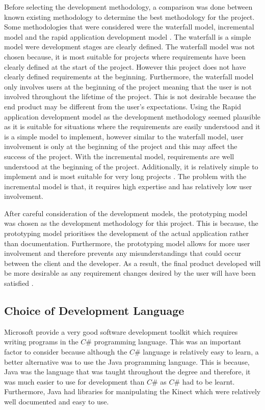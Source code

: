 \documentclass[a4paper, 12pt]{article}
\begin{document}
Before selecting the development methodology, a comparison was done between known existing methodology to determine the best methodology for the project. Some methodologies that were considered were the waterfall model, incremental model and the rapid application development model \citep{Sabale2012}. The waterfall is a simple model were development stages are clearly defined. The waterfall model was not chosen because, it is most suitable for projects where requirements have been clearly defined at the start of the project. However this project does not have clearly defined requirements at the beginning. Furthermore, the waterfall model only involves users at the beginning of the project meaning that the user is not involved throughout the lifetime of the project. This is not desirable because the end product may be different from the user's expectations.  Using the Rapid application development model as the development methodology seemed plausible as it is suitable for situations where the requirements are easily understood and it is a simple model to implement, however similar to the waterfall model, user involvement is only at the beginning of the project and this may affect the success of the project. With the incremental model, requirements are well understood at the beginning of the project. Additionally, it is relatively simple to implement and is most suitable for very long projects \citep{Sabale2012}. The problem with the incremental model is that, it requires high expertise and has relatively low user involvement.

\parskip 0.2in

After careful consideration of the development models, the prototyping model was chosen as the development methodology for this project. This is because, the prototyping model prioritises the development of the actual application rather than documentation. Furthermore, the prototyping model allows for more user involvement and therefore prevents any misunderstandings that could occur between the client and the developer. As a result, the final product developed will be more desirable as any requirement changes desired by the user will have been satisfied \citep{Sabale2012}.


\subsection{Choice of Development Language}
Microsoft provide a very good software development toolkit which requires writing programs in the $C\#$ programming language. This was an important factor to consider because although the $C\#$ language is relatively easy to learn, a better alternative was to use the Java programming language. This is because, Java was the language that was taught throughout the degree and therefore, it was much easier to use for development than $C\#$ as $C\#$ had to be learnt. Furthermore, Java had libraries for manipulating the Kinect which were relatively well documented and easy to use. 
\end{document}
